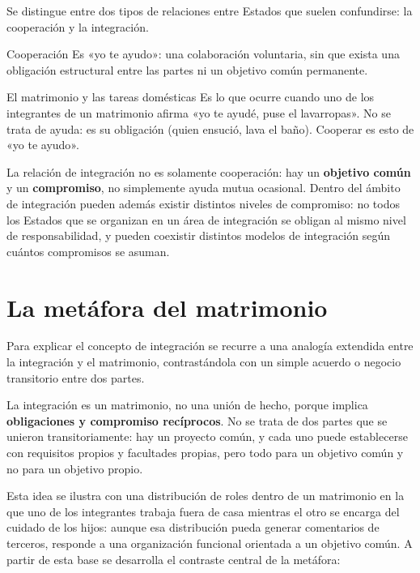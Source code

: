 \documentclass[12pt,oneside]{book}
\begin{document}
Se distingue entre dos tipos de relaciones entre Estados que suelen confundirse: la cooperación y la integración.

\begin{definicion}{Cooperación}
Es «yo te ayudo»: una colaboración voluntaria, sin que exista una obligación estructural entre las partes ni un objetivo común permanente.
\end{definicion}

\begin{ejemplo}{El matrimonio y las tareas domésticas}
Es lo que ocurre cuando uno de los integrantes de un matrimonio afirma «yo te ayudé, puse el lavarropas». No se trata de ayuda: es su obligación (quien ensució, lava el baño). Cooperar es esto de «yo te ayudo».
\end{ejemplo}

La relación de integración no es solamente cooperación: hay un \textbf{objetivo común} y un \textbf{compromiso}, no simplemente ayuda mutua ocasional. Dentro del ámbito de integración pueden además existir distintos niveles de compromiso: no todos los Estados que se organizan en un área de integración se obligan al mismo nivel de responsabilidad, y pueden coexistir distintos modelos de integración según cuántos compromisos se asuman.

\section{La metáfora del matrimonio}
\label{sec:matrimonio}

Para explicar el concepto de integración se recurre a una analogía extendida entre la integración y el matrimonio, contrastándola con un simple acuerdo o negocio transitorio entre dos partes.

\begin{importante}
La integración es un matrimonio, no una unión de hecho, porque implica \textbf{obligaciones y compromiso recíprocos}. No se trata de dos partes que se unieron transitoriamente: hay un proyecto común, y cada uno puede establecerse con requisitos propios y facultades propias, pero todo para un objetivo común y no para un objetivo propio.
\end{importante}

Esta idea se ilustra con una distribución de roles dentro de un matrimonio en la que uno de los integrantes trabaja fuera de casa mientras el otro se encarga del cuidado de los hijos: aunque esa distribución pueda generar comentarios de terceros, responde a una organización funcional orientada a un objetivo común. A partir de esta base se desarrolla el contraste central de la metáfora:
\end{document}
